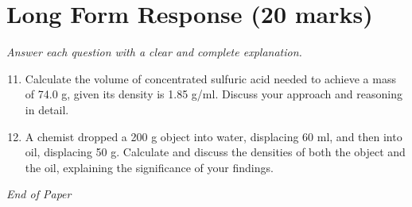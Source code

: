 \documentclass[12pt]{article}
\begin{document}
\section*{Long Form Response (20 marks)}
\textit{Answer each question with a clear and complete explanation.}
\begin{enumerate}[label=\arabic*.]
\setcounter{enumi}{10}
\item Calculate the volume of concentrated sulfuric acid needed to achieve a mass of 74.0 g, given its density is 1.85 g/ml. Discuss your approach and reasoning in detail.
\item A chemist dropped a 200 g object into water, displacing 60 ml, and then into oil, displacing 50 g. Calculate and discuss the densities of both the object and the oil, explaining the significance of your findings.
\end{enumerate}

\vfill
\noindent\textit{End of Paper}
\end{document}
